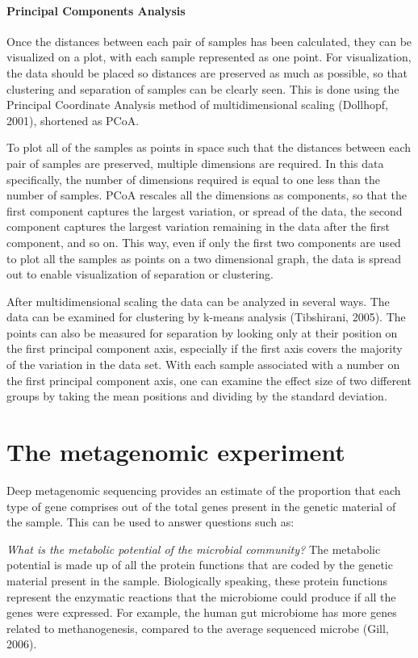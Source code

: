 \paragraph{Principal Components Analysis}
Once the distances between each pair of samples has been calculated, they can be visualized on a plot, with each sample represented as one point. For visualization, the data should be placed so distances are preserved as much as possible, so that clustering and separation of samples can be clearly seen. This is done using the Principal Coordinate Analysis method of multidimensional scaling (Dollhopf, 2001), shortened as PCoA.

To plot all of the samples as points in space such that the distances between each pair of samples are preserved, multiple dimensions are required. In this data specifically, the number of dimensions required is equal to one less than the number of samples. PCoA rescales all the dimensions as components, so that the first component captures the largest variation, or spread of the data, the second component captures the largest variation remaining in the data after the first component, and so on. This way, even if only the first two components are used to plot all the samples as points on a two dimensional graph, the data is spread out to enable visualization of separation or clustering.

After multidimensional scaling the data can be analyzed in several ways. The data can be examined for clustering by k-means analysis (Tibshirani, 2005). The points can also be measured for separation by looking only at their position on the first principal component axis, especially if the first axis covers the majority of the variation in the data set. With each sample associated with a number on the first principal component axis, one can examine the effect size of two different groups by taking the mean positions and dividing by the standard deviation.

\section{The metagenomic experiment}
Deep metagenomic sequencing provides an estimate of the proportion that each type of gene comprises out of the total genes present in the genetic material of the sample. This can be used to answer questions such as:

\textit{What is the metabolic potential of the microbial community?}
The metabolic potential is made up of all the protein functions that are coded by the genetic material present in the sample. Biologically speaking, these protein functions represent the enzymatic reactions that the microbiome could produce if all the genes were expressed. For example, the human gut microbiome has more genes related to methanogenesis, compared to the average sequenced microbe (Gill, 2006).

